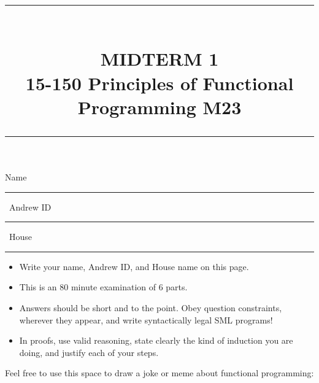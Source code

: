 \documentclass[addpoints,12pt, answers]{exam}
\newcommand{\HRule}[1]{\rule{\linewidth}{#1}}
\begin{document}
\pagestyle{fancy}
\fancyhead{} %
\fancyfoot[C]{\thepage} %


\setlength{\droptitle}{-8em}   %

\title{ \normalsize \textsc{}
		\HRule{1.5pt} \\
		\large \textbf{
      \uppercase{Midterm 1} \\
      15-150 Principles of Functional Programming M23} \\
    \HRule{1.5pt}
    \date{}
}

\maketitle

\vspace{-3cm}

\hspace{-1cm} Name \rule{5cm}{0.4pt} \, Andrew ID \rule{3cm}{0.4pt} \, House \rule{3.5cm}{0.4pt}

\vspace{5pt}

\begin{itemize}
  \item Write your name, Andrew ID, and House name on this page.
  \item This is an 80 minute examination of 6 parts.
  \item Answers should be short and to the point. Obey question constraints, wherever
  they appear, and write syntactically legal SML programs!
  \item In proofs, use valid reasoning, state clearly the kind of induction you are
  doing, and justify each of your steps.
\end{itemize}
\vspace{\fill}

{\small
\vqword{}
\begin{center}
\gradetable[v][questions]
\end{center}
}

\vspace{\fill}

\begin{center}
  Feel free to use this space to draw a joke or meme about functional programming: \\

  \vspace{10pt}

  \fbox{\rule{6in}{0pt}\rule[-0.5ex]{0pt}{2.5in}}
\end{center}
\end{document}
